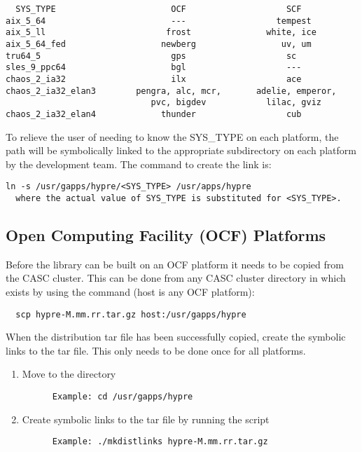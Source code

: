 \begin{verbatim}
  SYS_TYPE                       OCF                    SCF
aix_5_64                         ---                  tempest
aix_5_ll                        frost               white, ice
aix_5_64_fed                   newberg                 uv, um
tru64_5                          gps                    sc
sles_9_ppc64                     bgl                    ---
chaos_2_ia32                     ilx                    ace
chaos_2_ia32_elan3        pengra, alc, mcr,       adelie, emperor,
                             pvc, bigdev            lilac, gviz
chaos_2_ia32_elan4             thunder                  cub
\end{verbatim}

To relieve the user of needing to know the SYS\_TYPE on each platform, the path
 will be symbolically linked to the appropriate subdirectory
on each platform by the development team.  The command to create the link is:
\begin{verbatim}
ln -s /usr/gapps/hypre/<SYS_TYPE> /usr/apps/hypre
  where the actual value of SYS_TYPE is substituted for <SYS_TYPE>.
\end{verbatim}

\subsection{Open Computing Facility (OCF) Platforms}
\label{Open Computing Facility (OCF) Platforms}

Before the \hypre{} library can be built on an OCF platform it needs to be 
copied from the CASC cluster.  This can be done from any CASC cluster directory
in which  exists by using the command (host is any OCF
platform):
\begin{verbatim}
  scp hypre-M.mm.rr.tar.gz host:/usr/gapps/hypre
\end{verbatim}

When the distribution tar file has been successfully copied, create the symbolic
links to the tar file. This only needs to be done once for all platforms.

\begin{enumerate}
\item Move to the  directory
\begin{verbatim}
      Example: cd /usr/gapps/hypre
\end{verbatim}
\item Create symbolic links to the tar file by running the  script
\begin{verbatim}
      Example: ./mkdistlinks hypre-M.mm.rr.tar.gz
\end{verbatim}
\end{enumerate}

